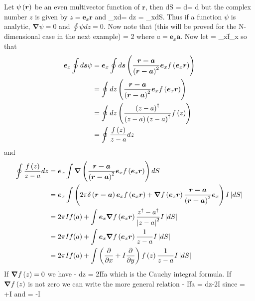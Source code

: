 Let ${\psi}\left ( {\bm{r}} \right )$ be an even multivector function of $\bm{r}$, then
\be
	\int\bm{\nabla}\psi dS = \oint d\psi = \oint{}\psi d\lambda
\ee
but the complex number $z$ is given by $z=\bm{e}_{x}\bm{r}$ and
\be
{}_{x}\oint d\psi = \oint \psi dz = \int{}_{x}\bm{\nabla}\psi dS.
\ee
Thus if a function $\psi$ is analytic, $\bm{\nabla}\psi = 0$ and $\oint \psi dz = 0$.  Now note that (this will be proved for the N-dimensional case in the next
example)
\be
\bm{\nabla} = 2\pi\f{\delta}{}
\ee
where $a = \bm{e}_{x}\bm{a}$.  Now let
\be
\psi = _{x}\f{f}{_{x}}
\ee
so that
\begin{align}
\bm{e}_{x}\oint d\bm{s}\psi &=  \bm{e}_{x}\oint d\bm{s}\left ( \displaystyle\frac{\bm{r-a}}{\left ( {\bm{r-a}} \right )^{2}}\bm{e}_{x}{f}\left ( {\bm{e}_{x}\bm{r}} \right )\right ) \nonumber \\
                            &=  \oint dz\left ( \displaystyle\frac{\bm{r-a}}{\left ( {\bm{r-a}} \right )^{2}}\bm{e}_{x}{f}\left ( {\bm{e}_{x}\bm{r}} \right )\right ) \nonumber \\
                            &=  \oint dz\left ( \displaystyle\frac{\left ( z-a\right )^{\dagger}}{\left ( z-a\right ) \left ( z-a\right )^{\dagger}}{f}\left ( {z} \right )\right ) \nonumber \\
                            &=  \oint \displaystyle\frac{{f}\left ( {z} \right )}{z-a} dz
\end{align}
and
\begin{align}
\oint\displaystyle\frac{{f}\left ( {z} \right )}{z-a}dz &= \bm{e}_{x}\int{\bm{\nabla}}\left ( {\displaystyle\frac{\bm{r-a}}{\left ( {\bm{r-a}} \right )^{2}}\bm{e}_{x}{f}\left ( {\bm{e}_{x}\bm{r}} \right )} \right ) dS \nonumber \\
                             &= \bm{e}_{x}\int\left ( 2\pi{\delta}\left ( {\bm{r-a}} \right )\bm{e}_{x}{f}\left ( {\bm{e}_{x}\bm{r}} \right )+\bm{\nabla}{f}\left ( {\bm{e}_{x}\bm{r}} \right )\displaystyle\frac{\bm{r-a}}{\left ( {\bm{r-a}} \right )^{2}}\bm{e}_{x}\right ) I\left | {dS} \right | \nonumber \\
                             &= 2\pi I{f}\!\left ({a}\right )+\int\bm{e}_{x}\bm{\nabla}{f}\left ( {\bm{e}_{x}\bm{r}} \right )\displaystyle\frac{z^{\dagger}-a^{\dagger}}{\left | {z-a} \right |^{2}}I\left | {dS} \right | \nonumber \\
                             &= 2\pi I{f}\!\left ({a}\right )+\int\bm{e}_{x}\bm{\nabla}{f}\left ( {\bm{e}_{x}\bm{r}} \right )\displaystyle\frac{1}{z-a}I\left | {dS} \right | \nonumber \\
                             &= 2\pi I{f}\!\left ({a}\right )+\int\left (\displaystyle\frac{\partial{}}{\partial{x}}+I\displaystyle\frac{\partial{}}{\partial{y}}\right ){f}\left ( {z} \right )\displaystyle\frac{1}{z-a}I\left | {dS} \right |
\end{align}
If $\bm{\nabla}{f}\left ( {z} \right )=0$ we have -
\be
\oint{}dz = 2\pi I\f{f}{a}
\ee
which is the Cauchy integral formula. If $\bm{\nabla}{f}\left ( {z} \right )$ is not zero we can write the more general relation -
\pi I\f{f}{a} = \oint{}dz-2\int{}I
\ee
since
\be
	 = \half\lp{}+I\rp
\ee
and
\be
	 = \half\lp{}-I\rp
\ee
